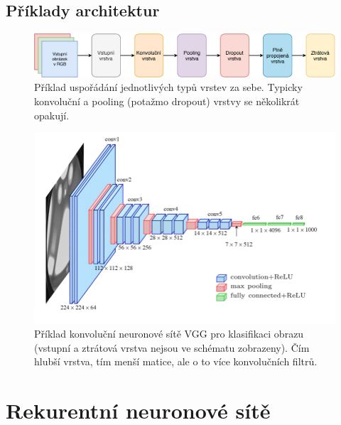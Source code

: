 \subsection{Příklady architektur}

\begin{figure}[H]
    \centering
    \includegraphics[width=1\linewidth]{conv-arch.pdf}
    \caption{Příklad uspořádání jednotlivých typů vrstev za sebe. Typicky konvoluční a pooling (potažmo dropout) vrstvy se několikrát opakují.}
\end{figure}

\begin{figure}[H]
    \centering
    \includegraphics[width=1\linewidth]{vgg.png}
    \caption{Příklad konvoluční neuronové sítě VGG pro klasifikaci obrazu (vstupní a ztrátová vrstva nejsou ve schématu zobrazeny). Čím hlubší vrstva, tím menší matice, ale o to více konvolučních filtrů.}
\end{figure}


\section{Rekurentní neuronové sítě}

